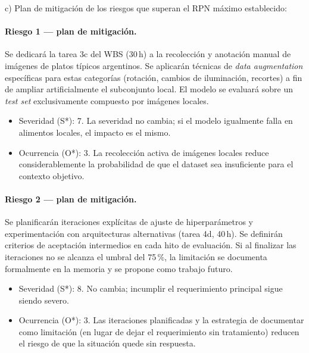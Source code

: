 \documentclass[
11pt, %
]{charter}
\begin{document}
c) Plan de mitigación de los riesgos que superan el RPN máximo establecido:

\paragraph{Riesgo 1 --- plan de mitigación.}
Se dedicará la tarea 3c del WBS (30\,h) a la recolección y anotación manual de imágenes de platos típicos argentinos. Se aplicarán técnicas de \textit{data augmentation} específicas para estas categorías (rotación, cambios de iluminación, recortes) a fin de ampliar artificialmente el subconjunto local. El modelo se evaluará sobre un \textit{test set} exclusivamente compuesto por imágenes locales.
\begin{itemize}
	\item Severidad (S*): 7. La severidad no cambia; si el modelo igualmente falla en alimentos locales, el impacto es el mismo.
	\item Ocurrencia (O*): 3. La recolección activa de imágenes locales reduce considerablemente la probabilidad de que el dataset sea insuficiente para el contexto objetivo.
\end{itemize}

\paragraph{Riesgo 2 --- plan de mitigación.}
Se planificarán iteraciones explícitas de ajuste de hiperparámetros y experimentación con arquitecturas alternativas (tarea 4d, 40\,h). Se definirán criterios de aceptación intermedios en cada hito de evaluación. Si al finalizar las iteraciones no se alcanza el umbral del 75\,\%, la limitación se documenta formalmente en la memoria y se propone como trabajo futuro.
\begin{itemize}
	\item Severidad (S*): 8. No cambia; incumplir el requerimiento principal sigue siendo severo.
	\item Ocurrencia (O*): 3. Las iteraciones planificadas y la estrategia de documentar como limitación (en lugar de dejar el requerimiento sin tratamiento) reducen el riesgo de que la situación quede sin respuesta.
\end{itemize}
\end{document}
